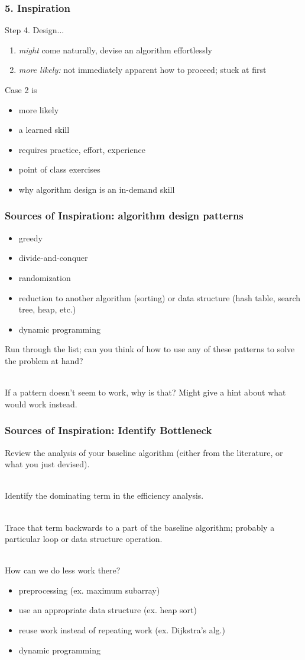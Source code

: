 \documentclass{beamer}
\newcommand{\stanza}{ \\~\ }
\begin{document}
\begin{frame} \frametitle{5. Inspiration}
Step 4. Design...
\begin{enumerate}
  \item \emph{might} come naturally, devise an algorithm effortlessly
  \item \emph{more likely:} not immediately apparent how to proceed; stuck
    at first
\end{enumerate}
\vspace{.5cm}
Case 2 is
\begin{itemize}
  \item more likely
  \item a learned skill
  \item requires practice, effort, experience
  \item point of class exercises
  \item why algorithm design is an in-demand skill
\end{itemize}
\end{frame}

\begin{frame} \frametitle{Sources of Inspiration: algorithm design patterns}
\begin{itemize}
  \item greedy
  \item divide-and-conquer
  \item randomization
  \item reduction to another algorithm (sorting) or data structure (hash table,
    search tree, heap, etc.)
  \item dynamic programming
\end{itemize}
\vspace{.5cm}
Run through the list; can you think of how to use any of these patterns to solve
the problem at hand? \stanza

If a pattern doesn't seem to work, why is that? Might give a hint about what
would work instead.
\end{frame}

\begin{frame} \frametitle{Sources of Inspiration: Identify Bottleneck}
Review the analysis of your baseline algorithm (either from the literature,
or what you just devised). \stanza

Identify the dominating term in the efficiency analysis. \stanza

Trace that term backwards to a part of the baseline algorithm; probably a
particular loop or data structure operation. \stanza

How can we do less work there?
\begin{itemize}
  \item preprocessing (ex. maximum subarray)
  \item use an appropriate data structure (ex. heap sort)
  \item reuse work instead of repeating work (ex. Dijkstra's alg.)
  \item dynamic programming
\end{itemize}
\end{frame}
\end{document}
